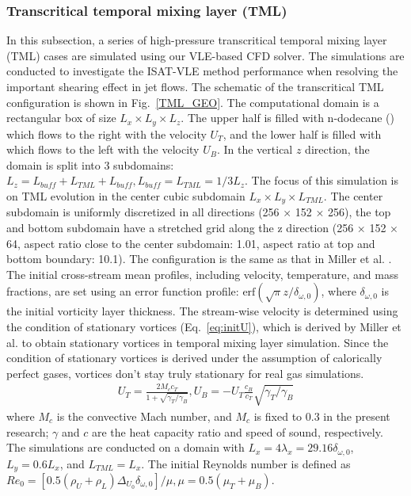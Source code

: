 \subsubsection{Transcritical temporal mixing layer (TML)}
\label{sec:TML}

In this subsection, a series of high-pressure transcritical temporal mixing layer (TML) cases are simulated using our VLE-based CFD solver. The simulations are conducted to investigate the ISAT-VLE method performance when resolving the important shearing effect in jet flows. The schematic of the transcritical TML configuration is shown in Fig.~\ref{TML_GEO}. The computational domain is a rectangular box of size $L_x \times L_y \times L_z$.
The upper half is filled with n-dodecane () which flows to the right with the velocity $U_T$, and the lower half is filled with  which flows to the left with the velocity $U_B$. In the vertical $z$ direction, the domain is split into 3 subdomains: $L_z = L_{buff}+L_{TML}+L_{buff}, L_{buff} = L_{TML} = 1/3 L_z$. The focus of this simulation is on TML evolution in the center cubic subdomain $L_x \times L_y \times L_{TML}$. The center subdomain is uniformly discretized in all directions (256 × 152 × 256), the top and bottom subdomain have a stretched grid along the z direction (256 × 152 × 64, aspect ratio close to the center subdomain: 1.01, aspect ratio at top and bottom boundary: 10.1). The configuration is the same as that in Miller et al. \cite{miller2001direct}. The initial cross-stream mean profiles, including velocity, temperature, and mass fractions, are set using an error function profile: $\textrm{erf}(\sqrt{\pi}z/\delta_{\omega,0})$, where $\delta_{\omega,0}$ is the initial vorticity layer thickness. The stream-wise velocity is determined using the condition of stationary vortices (Eq.~\ref{eq:initU}), which is derived by Miller et al. \cite{miller2001direct} to obtain stationary vortices in temporal mixing layer simulation. Since the condition of stationary vortices is derived under the assumption of calorically perfect gases, vortices don't stay truly stationary for real gas simulations.
\begin{align} U_T = \frac{2M_c c_T}{1+\sqrt{\gamma_T/\gamma_B}},U_B = -U_T \frac{c_B}{c_T}\sqrt{\gamma_T/\gamma_B} \label{eq:initU} \end{align}
where $M_c$ is the convective Mach number, and $M_c$ is fixed to 0.3 in the present research; $\gamma$ and $c$ are the heat capacity ratio and speed of sound, respectively.
The simulations are conducted on a domain with $L_x = 4 \lambda_x = 29.16 \delta_{\omega,0}$, $L_y = 0.6 L_x$, and $L_{TML}=L_x$.
The initial Reynolds number is defined as $Re_0 = [0.5(\rho_U +\rho_L)\Delta_{U_0} \delta_{\omega,0}]/\mu,\mu = 0.5 (\mu_T+\mu_B)$.

